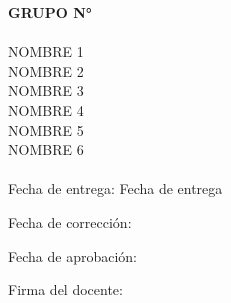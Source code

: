 
\begin{titlepage}
    \begin{center}
        \unidad
        
        \Large
        \titulo
        
        \end{center}
        \vspace{0.7cm}
        \normalsize    
        \textbf{GRUPO N° \grupo}\\
        \vspace{0.1cm}\\
        \noindent
        NOMBRE 1\\ %
        NOMBRE 2\\ %
        NOMBRE 3\\ %
        NOMBRE 4\\ %
        NOMBRE 5\\ %
        NOMBRE 6\\ %
        \vspace{0.3cm}\\
        \noindent
            Fecha de entrega: Fecha de entrega 
            
        \noindent
            Fecha de corrección:
        \indent
        \bigskip
        
        \bigskip
        
        \noindent
        Fecha de aprobación:
        
        \medskip
        \noindent
        Firma del docente:
        
\end{titlepage}